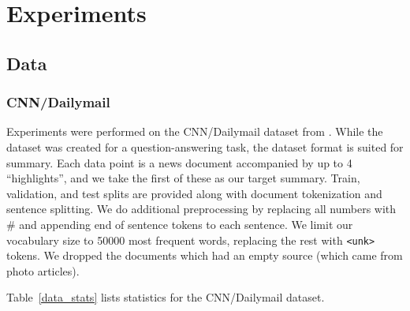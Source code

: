 \documentclass[11pt]{report}
\begin{document}
%
%

%


\chapter{Experiments}

\section{Data}

\subsection{CNN/Dailymail}

Experiments were performed on the CNN/Dailymail dataset from \cite{Hermann2015}. While the dataset was created for a question-answering task, the dataset format is suited for summary. Each data point is a news document accompanied by up to 4 ``highlights'', and we take the first of these as our target summary. Train, validation, and test splits are provided along with document tokenization and sentence splitting. We do additional preprocessing by replacing all numbers with \# and appending end of sentence tokens to each sentence. We limit our vocabulary size to 50000 most frequent words, replacing the rest with \texttt{<unk>} tokens. We dropped the documents which had an empty source (which came from photo articles).

 Table~\ref{data_stats} lists statistics for the CNN/Dailymail dataset.
\end{document}
